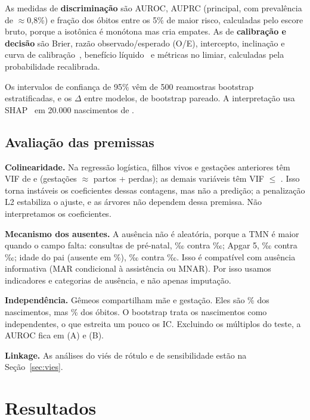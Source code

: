\documentclass[12pt]{article}
\begin{document}
As medidas de \textbf{discriminação} são AUROC, AUPRC (principal, com prevalência de $\approx$0,8\%) e fração dos óbitos entre os 5\% de maior risco, calculadas pelo escore bruto, porque a isotônica é monótona mas cria empates. As de \textbf{calibração e decisão} são Brier, razão observado/esperado (O/E), intercepto, inclinação e curva de calibração~\cite{vancalster2019}, benefício líquido~\cite{vickers2006} e métricas no limiar, calculadas pela probabilidade recalibrada.

Os intervalos de confiança de 95\% vêm de 500 reamostras bootstrap estratificadas, e os $\Delta$ entre modelos, de bootstrap pareado. A interpretação usa SHAP~\cite{lundberg2017} em 20.000 nascimentos de \anoTeste{}.

\subsection{Avaliação das premissas}

\textbf{Colinearidade.} Na regressão logística, filhos vivos e gestações anteriores têm VIF de \vifFilhos{} e \vifGest{} (gestações $\approx$ partos + perdas); as demais variáveis têm VIF $\leq$ \vifOutrosMax{}. Isso torna instáveis os coeficientes dessas contagens, mas não a predição; a penalização L2 estabiliza o ajuste, e as árvores não dependem dessa premissa. Não interpretamos os coeficientes.

\textbf{Mecanismo dos ausentes.} A ausência não é aleatória, porque a TMN é maior quando o campo falta: consultas de pré-natal, \ausCons{}‰ contra \preCons{}‰; Apgar 5, \ausApg{}‰ contra \preApg{}‰; idade do pai (ausente em \pctAusPai{}\%), \ausPai{}‰ contra \prePai{}‰. Isso é compatível com ausência informativa (MAR condicional à assistência ou MNAR). Por isso usamos indicadores e categorias de ausência, e não apenas imputação.

\textbf{Independência.} Gêmeos compartilham mãe e gestação. Eles são \pctMult{}\% dos nascimentos, mas \pctObMult{}\% dos óbitos. O bootstrap trata os nascimentos como independentes, o que estreita um pouco os IC. Excluindo os múltiplos do teste, a AUROC fica em \aurocUnicosA{} (A) e \aurocUnicosB{} (B).

\textbf{Linkage.} As análises do viés de rótulo e de sensibilidade estão na Seção~\ref{sec:vies}.

\section{Resultados}
\end{document}
